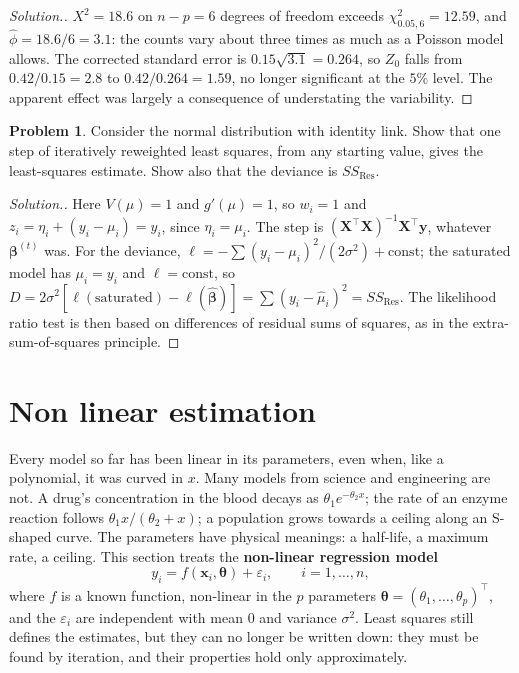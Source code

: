 \documentclass[11pt,a4paper]{article}
\numberwithin{equation}{section}
\theoremstyle{definition}
\newtheorem{problemx}{Problem}[subsection]
\newenvironment{problem}{\begin{problemx}}{\end{problemx}}
\newenvironment{solution}
  {\renewcommand{\qedsymbol}{}\begin{proof}[\textit{Solution}.]}
  {\end{proof}}
\begin{document}
\begin{solution}
$X^2 = 18.6$ on $n - p = 6$ degrees of freedom exceeds $\chi^2_{0.05,6} = 12.59$, and $\hat\phi = 18.6/6 = 3.1$: the counts vary about three
times as much as a Poisson model allows. The corrected standard error is $0.15\sqrt{3.1} = 0.264$, so $Z_0$ falls from
$0.42/0.15 = 2.8$ to $0.42/0.264 = 1.59$, no longer significant at the $5\%$ level. The apparent effect was largely
a consequence of understating the variability.
\end{solution}

\begin{problem}\label{prob:glm-normal}
Consider the normal distribution with identity link. Show that one step of
iteratively reweighted least squares, from any starting value, gives the least-squares estimate. Show also that the
deviance is $SS_{\mathrm{Res}}$.
\end{problem}

\begin{solution}
Here $V(\mu) = 1$ and $g'(\mu) = 1$, so $w_i = 1$ and $z_i = \eta_i + (y_i - \mu_i) = y_i$, since $\eta_i = \mu_i$. The step is
$(\mathbf{X}^\top\mathbf{X})^{-1}\mathbf{X}^\top\mathbf{y}$, whatever $\boldsymbol\beta^{(t)}$ was. For the deviance, $\ell = -\sum(y_i - \mu_i)^2/(2\sigma^2) + \text{const}$; the
saturated model has $\mu_i = y_i$ and $\ell = \text{const}$, so
$D = 2\sigma^2[\ell(\text{saturated}) - \ell(\hat{\boldsymbol\beta})] = \sum(y_i - \hat\mu_i)^2 = SS_{\mathrm{Res}}$. The likelihood ratio test is then
based on differences of residual sums of squares, as in the extra-sum-of-squares principle.
\end{solution}

\section{Non linear estimation}
Every model so far has been linear in its parameters, even when, like a polynomial, it was curved in $x$.
Many models from science and engineering are not. A drug's concentration in the blood decays as
$\theta_1e^{-\theta_2x}$; the rate of an enzyme reaction follows $\theta_1x/(\theta_2 + x)$; a population grows towards a ceiling along an
S-shaped curve. The parameters have physical meanings: a half-life, a maximum rate, a ceiling. This
section treats the \textbf{non-linear regression model}
\[
y_i = f(\mathbf{x}_i, \boldsymbol\theta) + \varepsilon_i , \qquad i = 1, \dots, n ,
\]
where $f$ is a known function, non-linear in the $p$ parameters $\boldsymbol\theta = (\theta_1, \dots, \theta_p)^\top$, and the $\varepsilon_i$ are
independent with mean $0$ and variance $\sigma^2$. Least squares still defines the estimates, but they can no longer
be written down: they must be found by iteration, and their properties hold only approximately.
\end{document}
